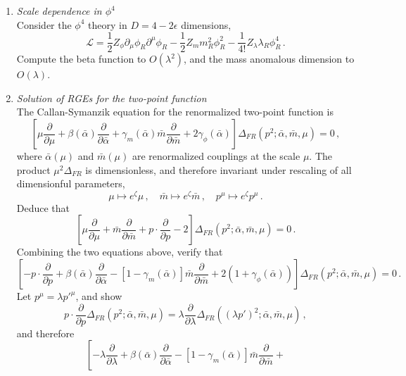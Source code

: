 \documentclass[12pt,a4paper]{article}
\begin{document}
\begin{enumerate}
  \bigskip

\item {\it Scale dependence in $\phi^4$}\\

  Consider the $\phi^4$ theory in $D=4-2\epsilon$ dimensions,
  \[
    \mathcal{L} = \frac12 Z_\phi \partial_\mu \phi_R \partial^\mu \phi_R -
    \frac12 Z_m m_R^2 \phi_R^2 -\frac{1}{4!} Z_\lambda \lambda_R
    \phi_R^4\, .
  \]
  Compute the beta function to $O(\lambda^2)$, and the mass anomalous
  dimension to $O(\lambda)$.

  \bigskip
  
\item {\it Solution of RGEs for the two-point function}\\

  The Callan-Symanzik equation for the renormalized two-point function
  is
  \[
    \left[
      \mu \frac{\partial}{\partial \mu} + \beta(\bar\alpha)
      \frac{\partial}{\partial \bar\alpha} + \gamma_m(\bar\alpha)
      \bar{m} \frac{\partial}{\partial \bar{m}} +
      2 \gamma_\phi(\bar\alpha)
    \right] \Delta_{FR}(p^2; \bar\alpha, \bar{m}, \mu)=0\, , 
  \]
  where $\bar\alpha(\mu)$ and $\bar{m}(\mu)$ are renormalized
  couplings at the scale $\mu$.
 The product $\mu^2 \Delta_{FR}$ is dimensionless, and therefore
 invariant under rescaling of all dimensionful parameters, \viz
 \[
   \mu \mapsto e^\zeta \mu\, , \quad
   \bar{m} \mapsto e^\zeta \bar{m}\, , \quad
   p^\mu \mapsto e^\zeta p^\mu\, .
 \]
 Deduce that
 \[
   \left[
      \mu \frac{\partial}{\partial \mu} + 
      \bar{m} \frac{\partial}{\partial \bar{m}} +
      p \cdot \frac{\partial}{\partial p} - 2
    \right] \Delta_{FR}(p^2; \bar\alpha, \bar{m}, \mu)=0\, .
  \]
  Combining the two equations above, verify that
  \[
    \left[
      -p\cdot \frac{\partial}{\partial p} + \beta(\bar\alpha)
      \frac{\partial}{\partial \bar\alpha} - \left[1-
        \gamma_m(\bar\alpha)\right] 
      \bar{m} \frac{\partial}{\partial \bar{m}} +
      2 (1+\gamma_\phi(\bar\alpha))
    \right] \Delta_{FR}(p^2; \bar\alpha, \bar{m}, \mu)=0\, .
  \]
  Let $p^\mu=\lambda p'^\mu$, and show
  \[
    p\cdot \frac{\partial}{\partial p} \Delta_{FR}(p^2; \bar\alpha,
    \bar{m}, \mu) =
    \lambda \frac{\partial}{\partial\lambda} \Delta_{FR}((\lambda
    p')^2; \bar\alpha, \bar{m}, \mu)\, ,
  \]
  and therefore
  \[
    \left[
      -\lambda \frac{\partial}{\partial \lambda} + \beta(\bar\alpha)
      \frac{\partial}{\partial \bar\alpha} - \left[1-
        \gamma_m(\bar\alpha)\right] 
      \bar{m} \frac{\partial}{\partial \bar{m}} +
\]
\end{enumerate}
\end{document}
